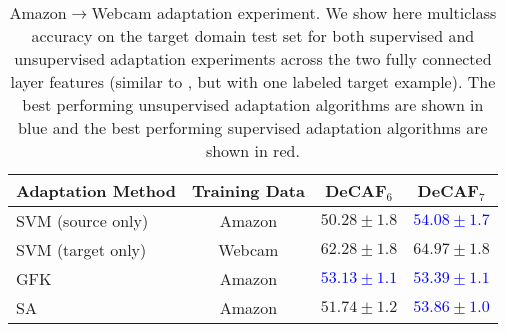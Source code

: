 \begin{table*}
\centering
\begin{tabular}{lccc}
\toprule
Adaptation Method & Training Data & DeCAF$_6$ & DeCAF$_7$ \\
\midrule
SVM (source only) & Amazon & $50.28 \pm 1.8$ & \textcolor{blue}{$\bm{54.08 \pm 1.7}$} \\
SVM (target only) & Webcam & $62.28 \pm 1.8$ & $64.97 \pm 1.8$ \\
\midrule
GFK \cite{gong-cvpr12} & Amazon & \textcolor{blue}{$\bm{53.13 \pm 1.1}$} & \textcolor{blue}{$\bm{53.39 \pm 1.1}$} \\
SA \cite{sa} & Amazon & $51.74 \pm 1.2$ & \textcolor{blue}{$\bm{53.86 \pm 1.0}$ }\\
\bottomrule
\end{tabular}

\caption{Amazon$\rightarrow$Webcam adaptation experiment. We show here
  multiclass accuracy on the target domain test set for both supervised and
  unsupervised adaptation experiments across the two fully connected layer
  features (similar to \cite{deeplearning-arxiv-2013}, but with one labeled
  target example). The best performing unsupervised adaptation algorithms are
  shown in blue and the best performing supervised adaptation algorithms are
  shown in red.}


\label{tab:fc6and7_amazon_unsup}
\end{table*}
